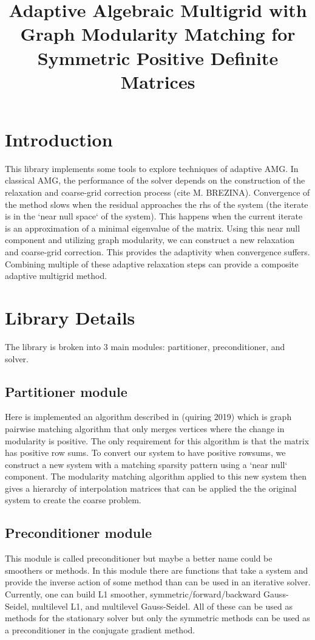 \documentclass[10pt]{article}
\title{Adaptive Algebraic Multigrid with Graph Modularity Matching for Symmetric Positive Definite Matrices}
\begin{document}
\maketitle

\section{Introduction}
This library implements some tools to explore techniques of adaptive AMG.
In classical AMG, the performance of the solver depends on the construction
of the relaxation and coarse-grid correction process (cite M. BREZINA).
Convergence of the method slows when the residual approaches the rhs of the
system (the iterate is in the `near null space` of the system).
This happens when the current iterate is an approximation of a minimal
eigenvalue of the matrix. Using this near null component and utilizing graph
modularity, we can construct a new relaxation and coarse-grid correction.
This provides the adaptivity when convergence suffers. Combining multiple of
these adaptive relaxation steps can provide a composite adaptive multigrid method.

\section{Library Details}
The library is broken into 3 main modules: partitioner, preconditioner, and solver.

\subsection{Partitioner module}
Here is implemented an algorithm described in (quiring 2019) which is graph pairwise
matching algorithm that only merges vertices where the change in modularity is
positive. The only requirement for this algorithm is that the matrix has positive
row sums. To convert our system to have positive rowsums, we construct a new system
with a matching sparsity pattern using a `near null` component. The modularity
matching algorithm applied to this new system then gives a hierarchy of interpolation
matrices that can be applied the the original system to create the coarse problem.

\subsection{Preconditioner module}
This module is called preconditioner but maybe a better name could be smoothers or
methods. In this module there are functions that take a system and provide the inverse
action of some method than can be used in an iterative solver. Currently, one can build 
L1 smoother, symmetric/forward/backward Gauss-Seidel, multilevel L1, and multilevel
Gauss-Seidel. All of these can be used as methods for the stationary solver but only
the symmetric methods can be used as a preconditioner in the conjugate gradient method.
\end{document}

